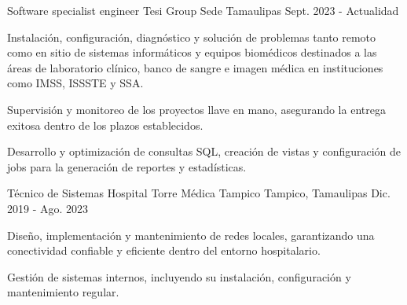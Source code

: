 

\begin{cventries}

  \cventry
    {Software specialist engineer} %
    {Tesi Group} %
    {Sede Tamaulipas} %
    {Sept. 2023 - Actualidad} %
    {
      \begin{cvitems} %
        \item {Instalación, configuración, diagnóstico y solución de problemas tanto remoto como en sitio de sistemas informáticos y equipos biomédicos destinados a las áreas de laboratorio clínico, banco de sangre e imagen médica en instituciones como IMSS, ISSSTE y SSA.} 
        \item {Supervisión y monitoreo de los proyectos llave en mano, asegurando la entrega exitosa dentro de los plazos establecidos.}
        \item {Desarrollo y optimización de consultas SQL, creación de vistas y configuración de jobs para la generación de reportes y estadísticas.}
      \end{cvitems}
    }

  \cventry
    {Técnico de Sistemas} %
    {Hospital Torre Médica Tampico} %
    {Tampico, Tamaulipas} %
    {Dic. 2019 - Ago. 2023} %
    {
      \begin{cvitems} %
        \item {Diseño, implementación y mantenimiento de redes locales, garantizando una conectividad confiable y eficiente dentro del entorno hospitalario. }
        \item {Gestión de sistemas internos, incluyendo su instalación, configuración y mantenimiento regular.}
      \end{cvitems}
    }


\end{cventries}
